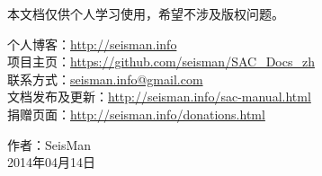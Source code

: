 本文档仅供个人学习使用，希望不涉及版权问题。

\begin{flushleft}
个人博客：\url{http://seisman.info}                         \\
项目主页：\url{https://github.com/seisman/SAC_Docs_zh}      \\
联系方式：\url{seisman.info@gmail.com}                      \\
文档发布及更新：\url{http://seisman.info/sac-manual.html}   \\
捐赠页面：\url{http://seisman.info/donations.html}          \\
\end{flushleft}

\begin{flushright}
作者：SeisMan \\
2014年04月14日
\end{flushright}
